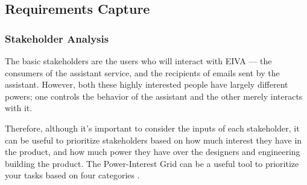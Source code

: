 \documentclass{article}
\begin{document}
\subsection{Requirements Capture}

\subsubsection{Stakeholder Analysis}

The basic stakeholders are the users who will interact with EIVA --- the consumers of the assistant service, and the recipients of emails sent by the assistant. However, both these highly interested people have largely different powers; one controls the behavior of the assistant and the other merely interacts with it.

Therefore, although it's important to consider the inputs of each stakeholder, it can be useful to prioritize stakeholders based on how much interest they have in the product, and how much power they have over the designers and engineering building the product. The Power-Interest Grid can be a useful tool to prioritize your tasks based on four categories \cite{noauthor_stakeholder_nodate}.
\end{document}
